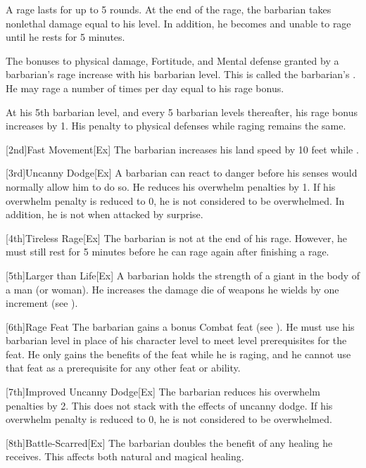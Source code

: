         A rage lasts for up to 5 rounds.
        At the end of the rage, the barbarian takes nonlethal damage equal to his level.
        In addition, he becomes \fatigued and unable to rage until he rests for 5 minutes.

        The bonuses to physical damage, Fortitude, and Mental defense granted by a barbarian's rage increase with his barbarian level.
        This is called the barbarian's .
        He may rage a number of times per day equal to his rage bonus.

        At his 5th barbarian level, and every 5 barbarian levels thereafter, his rage bonus increases by 1.
        His penalty to physical defenses while raging remains the same.

        [2nd]{Fast Movement}[Ex]
        The barbarian increases his land speed by 10 feet while \unencumbered.

        [3rd]{Uncanny Dodge}[Ex]
        A barbarian can react to danger before his senses would normally allow him to do so.
        He reduces his overwhelm penalties by 1.
        If his overwhelm penalty is reduced to 0, he is not considered to be overwhelmed.
        In addition, he is not \unaware when attacked by surprise.

        [4th]{Tireless Rage}[Ex]
        The barbarian is not \fatigued at the end of his rage.
        However, he must still rest for 5 minutes before he can rage again after finishing a rage.

        [5th]{Larger than Life}[Ex]
        A barbarian holds the strength of a giant in the body of a man (or woman).
        He increases the damage die of weapons he wields by one increment (see ).

        [6th]{Rage Feat}
        The barbarian gains a bonus Combat feat (see ).
        He must use his barbarian level in place of his character level to meet level prerequisites for the feat.
        He only gains the benefits of the feat while he is raging, and he cannot use that feat as a prerequisite for any other feat or ability.

        [7th]{Improved Uncanny Dodge}[Ex]
        The barbarian reduces his overwhelm penalties by 2.
        This does not stack with the effects of uncanny dodge.
        If his overwhelm penalty is reduced to 0, he is not considered to be overwhelmed.

        [8th]{Battle-Scarred}[Ex]
        The barbarian doubles the benefit of any healing he receives.
        This affects both natural and magical healing.

